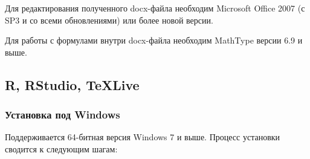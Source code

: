 \documentclass[
  a4paper,
]{book}
\theoremstyle{definition}
\theoremstyle{definition}
\theoremstyle{definition}
\theoremstyle{definition}
\theoremstyle{remark}
\begin{document}
Для редактирования полученного docx-файла необходим Microsoft Office 2007 (с SP3 и со всеми обновлениями) или более новой версии.

Для работы с формулами внутри docx-файла необходим MathType версии 6.9 и выше.

\hypertarget{software-r}{%
\subsection{R, RStudio, TeXLive}\label{software-r}}

\hypertarget{software-r-windows}{%
\subsubsection{Установка под Windows}\label{software-r-windows}}

Поддерживается 64-битная версия Windows 7 и выше. Процесс установки сводится к следующим шагам:
\end{document}
